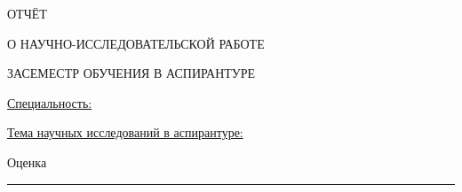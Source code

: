 \thispagestyle{empty}%
\begin{center}%
\thesisUperOrganization	
\vspace{0pt plus6fill} %
	
\MakeUppercase{\thesisOrganization}

\vspace{0pt plus6fill} %

ОТЧЁТ 

О НАУЧНО-ИССЛЕДОВАТЕЛЬСКОЙ РАБОТЕ 

ЗА\thesisSemestrNum СЕМЕСТР ОБУЧЕНИЯ В АСПИРАНТУРЕ

\end{center}%
%

%

\vspace{0pt plus1fill} %
\begin{center}%
\textbf {\large \reportTitle}

\vspace{0pt plus2fill} %

\begin{flushleft}%
\underline{Специальность:} \thesisSpecialtyNumber\thesisSpecialtyTitle

\underline{Тема научных исследований в аспирантуре:} \thesisTitle
\end{flushleft}%

\end{center}%
%

\vspace{0pt plus3fill} %
\begin{flushright}%
Оценка \rule{0.2\linewidth}{.2pt} \hphantom{aAAAAA}
\end{flushright}%
\vspace{0pt plus2fill} %

